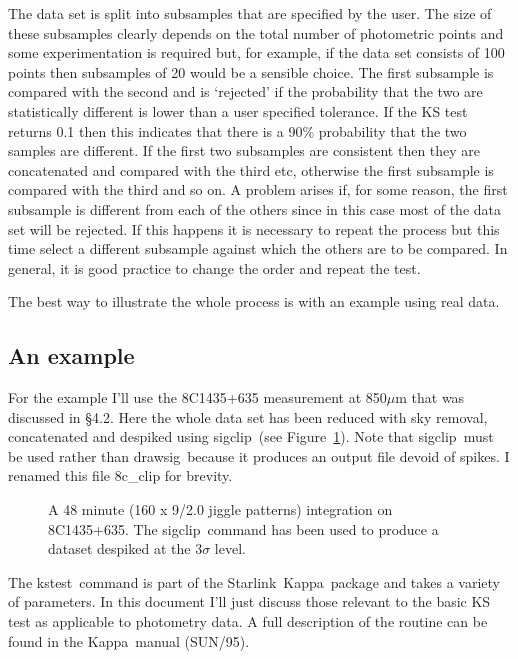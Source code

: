 \documentclass[twoside,11pt,fleqn]{article}
\newcommand{\starlink}{\htmladdnormallink{Starlink}{http://www.starlink.ac.uk/}}
\newcommand{\Kappa}{\xref{{\sc Kappa}}{sun95}{}}
\newcommand{\task}[1]{{\sf #1}}
\newcommand{\sigclip}{\xref{\task{sigclip}}{sun216}{SIGCLIP}}
\newcommand{\drawsig}{\xref{\task{drawsig}}{sun95}{DRAWSIG}}
\newcommand{\kstest}{\xref{\task{kstest}}{sun95}{KSTEST}}
\newcommand{\htmladdnormallink}[2]{#1}
\newcommand{\xref}[3]{#1}
\begin{document}
The data set is split into subsamples that are specified by the
user. The size of these subsamples clearly depends on the total number
of photometric points and some experimentation is required but, for
example, if the data set consists of 100 points then subsamples of 20
would be a sensible choice. The first subsample is compared with the
second and is `rejected' if the probability that the two are
statistically different is lower than a user specified tolerance. If
the KS test returns 0.1 then this indicates that there is a 90\%
probability that the two samples are different. If the first two
subsamples are consistent then they are concatenated and compared with
the third etc, otherwise the first subsample is compared with the
third and so on. A problem arises if, for some reason, the first
subsample is different from each of the others since in this case most
of the data set will be rejected. If this happens it is necessary to
repeat the process but this time select a different subsample against
which the others are to be compared. In general, it is good practice
to change the order and repeat the test.

The best way to illustrate the whole process is with an example using
real data.

\subsection{An example}

For the example I'll use the 8C1435+635 measurement at 850$\mu$m that was
discussed in \S 4.2. Here the whole data set has been reduced with sky
removal, concatenated and despiked using \sigclip\ (see Figure~\ref{f4}). Note
that \sigclip\ must be used rather than \drawsig\ because it produces an
output file devoid of spikes. I renamed this file 8c\_clip for brevity.

\begin{figure}
\caption{A 48 minute (160 x 9/2.0 jiggle patterns) integration on
8C1435+635. The \sigclip\ command has been used to produce a
dataset despiked at the 3$\sigma$ level.}
\label{f4}
\end{figure}

The \kstest\ command is part of the \starlink\
\Kappa\ package and
takes a variety of parameters. In this document I'll just discuss those
relevant to the basic KS test as applicable to photometry data. A full
description of the routine can be found in the \Kappa\ manual
(\xref{SUN/95}{sun95}{}).
\end{document}
